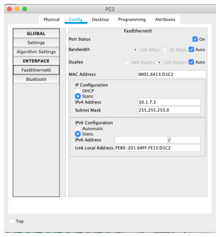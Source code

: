 \documentclass[a4paper,12pt]{article}
\begin{document}
\begin{figure}[h!]
\begin{minipage}[b]{0.32\textwidth}
		\end{minipage}
		\begin{minipage}[b]{0.32\textwidth}
			\includegraphics[width=\textwidth]{1.3.png}
		\end{minipage}
		\label{ris:1}
	\end{figure}
	
\end{document}
